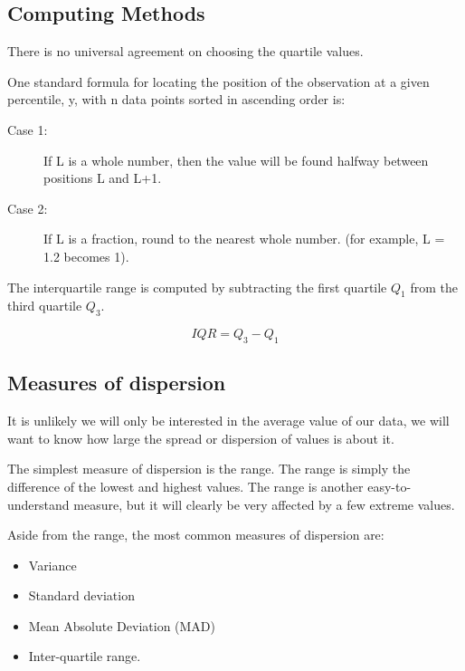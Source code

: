 \documentclass[]{report}
\begin{document}
\subsection*{Computing Methods}

There is no universal agreement on choosing the quartile values.


One standard formula for locating the position of the observation at a given percentile, y, 
with n data points sorted in ascending order is:

\begin{description}
\item[Case 1:] If L is a whole number, then the value will be found halfway between positions L and L+1. 
\item[Case 2:] If L is a fraction, round to the nearest whole number. (for example, L = 1.2 becomes 1). 
\end{description}


The interquartile range is computed by subtracting the first quartile $Q_1$ from the third quartile $Q_3$.

\[ IQR = Q_3 - Q_1 \]













\subsection{Measures of dispersion}
It is unlikely we will only be interested in the average value of our data, we will want
to know how large the spread or dispersion of values is about it. 

\noindent The simplest measure of dispersion is the range.
The range is simply the difference of the lowest and highest values. The range is
another easy-to-understand measure, but it will clearly be very affected by a few
extreme values.

\noindent Aside from the range, the most common measures of dispersion are:
\begin{itemize}
\item Variance
\item Standard deviation
\item Mean Absolute Deviation (MAD)
\item Inter-quartile range.
\end{itemize}
\noindent 
\end{document}
